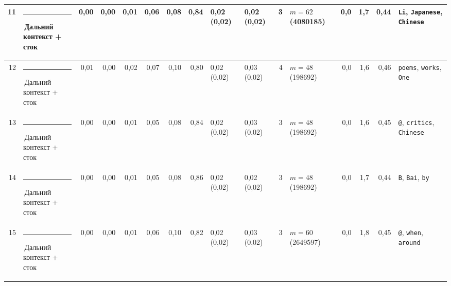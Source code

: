 \documentclass[10pt]{article}
\begin{document}
\begin{minipage}{\linewidth}
\begin{center}
{\begin{tabular}{|r|l|r|r|r|r|r|r|l|l|r|l|r|r|r|l|}
11 & \textcolor[HTML]{C3C2B7}{\rule{0.62em}{0.62em}}\,Дальний контекст + сток & 0,00 & 0,00 & 0,01 & 0,06 & 0,08 & 0,84 & 0,02 (0,02) & 0,02 (0,02) & 3 & $m{=}62$ (4080185) & 0,0 & 1,7 & 0,44 & \texttt{\textvisiblespace{}Li}, \texttt{\textvisiblespace{}Japanese}, \texttt{\textvisiblespace{}Chinese} \\ \hline
12 & \textcolor[HTML]{C3C2B7}{\rule{0.62em}{0.62em}}\,Дальний контекст + сток & 0,01 & 0,00 & 0,02 & 0,07 & 0,10 & 0,80 & 0,02 (0,02) & 0,03 (0,02) & 4 & $m{=}48$ (198692) & 0,0 & 1,6 & 0,46 & \texttt{\textvisiblespace{}poems}, \texttt{\textvisiblespace{}works}, \texttt{\textvisiblespace{}One} \\ \hline
13 & \textcolor[HTML]{C3C2B7}{\rule{0.62em}{0.62em}}\,Дальний контекст + сток & 0,00 & 0,00 & 0,01 & 0,05 & 0,08 & 0,84 & 0,02 (0,02) & 0,03 (0,02) & 3 & $m{=}48$ (198692) & 0,0 & 1,6 & 0,45 & \texttt{\textvisiblespace{}@}, \texttt{\textvisiblespace{}critics}, \texttt{\textvisiblespace{}Chinese} \\ \hline
14 & \textcolor[HTML]{C3C2B7}{\rule{0.62em}{0.62em}}\,Дальний контекст + сток & 0,00 & 0,00 & 0,01 & 0,05 & 0,08 & 0,86 & 0,02 (0,02) & 0,02 (0,02) & 3 & $m{=}48$ (198692) & 0,0 & 1,7 & 0,44 & \texttt{\textvisiblespace{}B}, \texttt{\textvisiblespace{}Bai}, \texttt{\textvisiblespace{}by} \\ \hline
15 & \textcolor[HTML]{C3C2B7}{\rule{0.62em}{0.62em}}\,Дальний контекст + сток & 0,00 & 0,00 & 0,01 & 0,06 & 0,10 & 0,82 & 0,02 (0,02) & 0,03 (0,02) & 3 & $m{=}60$ (2649597) & 0,0 & 1,8 & 0,45 & \texttt{\textvisiblespace{}@}, \texttt{\textvisiblespace{}when}, \texttt{\textvisiblespace{}around} \\ \hline
\hline\end{tabular}}\end{center}
\end{minipage}
\par\vspace{0.4em}
\end{document}
